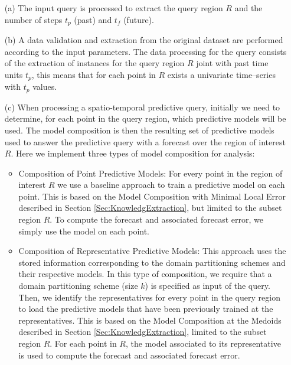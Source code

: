 \begin{itemize}
    \item [(a)] The input query is processed to extract the query region $R$ and the number of steps $t_p$ (past) and $t_f$ (future).
    \item [(b)] A data validation and extraction from the original dataset are performed according to the input parameters. The data processing for the query consists of the extraction of instances for the query region $R$ joint with past time units $t_{p}$, this means that for each point in $R$ exists a univariate time--series with $t_{p}$ values.
    \item [(c)] When processing a spatio-temporal predictive query, initially we need to determine, for each point in the query region, which predictive models will be used. The model composition is then the resulting set of predictive models used to answer the predictive query with a forecast over the region of interest $R$. Here we implement three types of model composition for analysis:

   \begin{itemize}
	\item Composition of Point Predictive Models: For every point in the region of interest $R$ we use a baseline approach to train a predictive model on each point. This is based on the Model Composition with Minimal Local Error described in Section \ref{Sec:KnowledgExtraction}, but limited to the subset region $R$. To compute the forecast and associated forecast error, we simply use the model on each point.

	\item Composition of Representative Predictive Models: This approach uses the stored information corresponding to the domain partitioning schemes and their respective models. In this type of composition, we require that a domain partitioning scheme (size $k$) is specified as input of the query. Then, we identify the representatives for every point in the query region to load the predictive models that have been previously trained at the representatives. This is based on the Model Composition at the Medoids described in Section \ref{Sec:KnowledgExtraction}, limited to the subset region $R$. For each point in $R$, the model associated to its representative is used to compute the forecast and associated forecast error.
	

\end{itemize}
\end{itemize}
